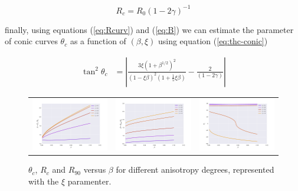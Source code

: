 \begin{equation}
R_c = R_0\left(1-2\gamma\right)^{-1}
\label{eq:Rcurv}
\end{equation}

finally, using equations (\ref{eq:Rcurv}) and (\ref{eq:B}) we can estimate the parameter of conic curves $\theta_c$ as a function of $(\beta,\xi)$ using equation (\ref{eq:thc-conic})

\begin{align}
\tan^2\theta_c &= \left| \frac{3\xi\left(1+\beta^{1/2}\right)^2}{\left(1-\xi\beta\right)^2\left(1+\frac{1}{5}\xi\beta\right)}-\frac{2}{\left(1-2\gamma\right)}\right| 
\label{eq:thc-CRW}
\end{align}

\begin{figure}
\begin{tabular}{ccc}
\includegraphics[width=0.35\linewidth]{A-beta}&
\includegraphics[width=0.35\linewidth]{B-beta} &
\includegraphics[width=0.35\linewidth]{thc-beta}
\end{tabular}
\caption{$\theta_c$, $R_c$ and $R_{90}$ versus $\beta$ for different anisotropy degrees, represented with the $\xi$ paramenter.}
\label{fig:rad-beta}
\end{figure}



